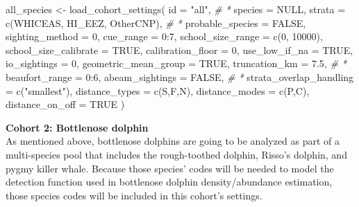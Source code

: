 \documentclass[
]{book}
\newenvironment{Shaded}{\begin{snugshade}}{\end{snugshade}}
\newcommand{\AttributeTok}[1]{\textcolor[rgb]{0.77,0.63,0.00}{#1}}
\newcommand{\CommentTok}[1]{\textcolor[rgb]{0.56,0.35,0.01}{\textit{#1}}}
\newcommand{\ConstantTok}[1]{\textcolor[rgb]{0.00,0.00,0.00}{#1}}
\newcommand{\DecValTok}[1]{\textcolor[rgb]{0.00,0.00,0.81}{#1}}
\newcommand{\FloatTok}[1]{\textcolor[rgb]{0.00,0.00,0.81}{#1}}
\newcommand{\FunctionTok}[1]{\textcolor[rgb]{0.00,0.00,0.00}{#1}}
\newcommand{\NormalTok}[1]{#1}
\newcommand{\OtherTok}[1]{\textcolor[rgb]{0.56,0.35,0.01}{#1}}
\newcommand{\SpecialCharTok}[1]{\textcolor[rgb]{0.00,0.00,0.00}{#1}}
\newcommand{\StringTok}[1]{\textcolor[rgb]{0.31,0.60,0.02}{#1}}
\begin{document}
\begin{Shaded}
\begin{Highlighting}[]
\NormalTok{all\_species }\OtherTok{\textless{}{-}} \FunctionTok{load\_cohort\_settings}\NormalTok{(}
  \AttributeTok{id =} \StringTok{"all"}\NormalTok{, }\CommentTok{\# *}
  \AttributeTok{species =} \ConstantTok{NULL}\NormalTok{, }
  \AttributeTok{strata =} \FunctionTok{c}\NormalTok{(}\StringTok{\textquotesingle{}WHICEAS\textquotesingle{}}\NormalTok{, }\StringTok{\textquotesingle{}HI\_EEZ\textquotesingle{}}\NormalTok{, }\StringTok{\textquotesingle{}OtherCNP\textquotesingle{}}\NormalTok{), }\CommentTok{\# *}
  \AttributeTok{probable\_species =} \ConstantTok{FALSE}\NormalTok{,}
  \AttributeTok{sighting\_method =} \DecValTok{0}\NormalTok{,}
  \AttributeTok{cue\_range =} \DecValTok{0}\SpecialCharTok{:}\DecValTok{7}\NormalTok{,}
  \AttributeTok{school\_size\_range =} \FunctionTok{c}\NormalTok{(}\DecValTok{0}\NormalTok{, }\DecValTok{10000}\NormalTok{),}
  \AttributeTok{school\_size\_calibrate =} \ConstantTok{TRUE}\NormalTok{,}
  \AttributeTok{calibration\_floor =} \DecValTok{0}\NormalTok{,}
  \AttributeTok{use\_low\_if\_na =} \ConstantTok{TRUE}\NormalTok{,}
  \AttributeTok{io\_sightings =} \DecValTok{0}\NormalTok{,}
  \AttributeTok{geometric\_mean\_group =} \ConstantTok{TRUE}\NormalTok{,}
  \AttributeTok{truncation\_km =} \FloatTok{7.5}\NormalTok{, }\CommentTok{\# *}
  \AttributeTok{beaufort\_range =} \DecValTok{0}\SpecialCharTok{:}\DecValTok{6}\NormalTok{,}
  \AttributeTok{abeam\_sightings =} \ConstantTok{FALSE}\NormalTok{, }\CommentTok{\# *}
  \AttributeTok{strata\_overlap\_handling =} \FunctionTok{c}\NormalTok{(}\StringTok{"smallest"}\NormalTok{),}
  \AttributeTok{distance\_types =} \FunctionTok{c}\NormalTok{(}\StringTok{\textquotesingle{}S\textquotesingle{}}\NormalTok{,}\StringTok{\textquotesingle{}F\textquotesingle{}}\NormalTok{,}\StringTok{\textquotesingle{}N\textquotesingle{}}\NormalTok{),}
  \AttributeTok{distance\_modes =} \FunctionTok{c}\NormalTok{(}\StringTok{\textquotesingle{}P\textquotesingle{}}\NormalTok{,}\StringTok{\textquotesingle{}C\textquotesingle{}}\NormalTok{),}
  \AttributeTok{distance\_on\_off =} \ConstantTok{TRUE}
\NormalTok{)}
\end{Highlighting}
\end{Shaded}

\textbf{Cohort 2: Bottlenose dolphin}\\
As mentioned above, bottlenose dolphins are going to be analyzed as part of a multi-species pool that includes the rough-toothed dolphin, Risso's dolphin, and pygmy killer whale. Because those species' codes will be needed to model the detection function used in bottlenose dolphin density/abundance estimation, those species codes will be included in this cohort's settings.
\end{document}

